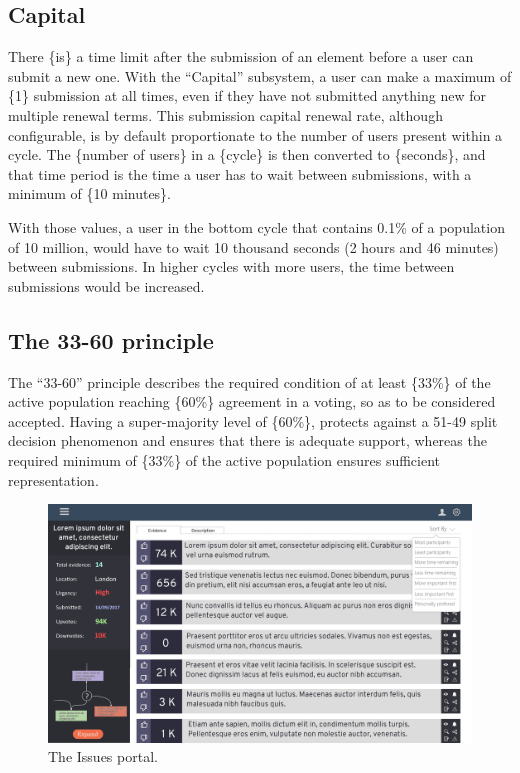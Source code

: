 \documentclass[a4paper,11pt]{article}
\begin{document}
\begin{multicols}{2}
\subsection{Capital} \label{capital}

There \{is\} a time limit after the submission of an element before a user can submit a new one. With the “Capital” subsystem, a user can make a maximum of \{1\} submission at all times, even if they have not submitted anything new for multiple renewal terms. This submission capital renewal rate, although configurable, is by default proportionate to the number of users present within a cycle. The \{number of users\} in a \{cycle\} is then converted to \{seconds\}, and that time period is the time a user has to wait between submissions, with a minimum of \{10 minutes\}. 

With those values, a user in the bottom cycle that contains 0.1\% of a population of 10 million, would have to wait 10 thousand seconds (2 hours and 46 minutes) between submissions. In higher cycles with more users, the time between submissions would be increased.

\subsection{The 33-60 principle} \label{principle}

The ``33-60'' principle describes the required condition of at least \{33\%\} of the active population reaching \{60\%\} agreement in a voting, so as to be considered accepted. Having a super-majority level of \{60\%\}, protects against a 51-49 split decision phenomenon and ensures that there is adequate support, whereas the required minimum of \{33\%\} of the active population ensures sufficient representation.

\begin{figure}
\centering
\includegraphics[width=140mm]{FigureA.jpg}
\caption{The Issues portal.}
\label{figure1}
\end{figure}


\end{multicols}
\end{document}

